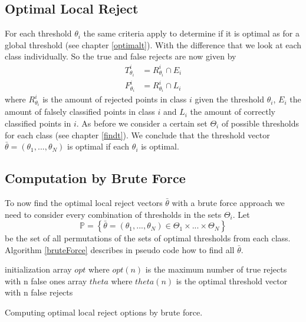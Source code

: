\subsection{Optimal Local Reject}
For each threshold $\theta_i$ the same criteria apply to determine if it is optimal as for a global threshold (see chapter \ref{optimalt}). With the difference that we look at each class individually. So the true and false rejects are now given by
\begin{align} 
T_{\theta_i}^i &= R_{\theta_i}^i \cap E_i \\ 
F_{\theta_i}^i &= R_{\theta_i}^i \cap L_i
\end{align}
where $R_{\theta_i}^i$ is the amount of rejected points in class $i$ given the threshold $\theta_i$, $E_i$ the amount of falsely classified points in class $i$ and $L_i$ the amount of correctly classified points in $i$. As before we consider a certain set $\Theta_i$ of possible thresholds for each class (see chapter \ref{findt}). We conclude that the threshold vector $\bar{\theta}=(\theta_1,...,\theta_N)$ is optimal if each $\theta_i$ is optimal. 



\subsection{Computation by Brute Force}
To now find the optimal local reject vectors $\bar{\theta}$ with a brute force approach we need to consider every combination of thresholds in the sets $\Theta_i$. Let
$$ \mathbb{P} = \left\{\bar{\theta} = \left(\theta_1,...,\theta_N\right) \in \Theta_1 \times ... \times \Theta_N \right\} $$
be the set of all permutations of the sets of optimal thresholds from each class. Algorithm \ref{bruteForce} describes in pseudo code how to find all $\bar{\theta}$.

\begin{algorithm}[!htbp]
 initialization\;
 array $opt$ where $opt(n)$ is the maximum number of true rejects with n false ones \;
 array $theta$ where $theta(n)$ is the optimal threshold vector with n false rejects \; 
 \BlankLine \BlankLine
 \caption{Computing optimal local reject options by brute force.}
 \label{bruteForce}
\end{algorithm}

